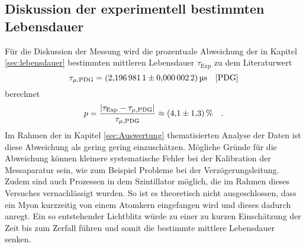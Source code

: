 \subsection{Diskussion der experimentell bestimmten Lebensdauer}
Für die Diskussion der Messung wird die prozentuale Abweichung der in Kapitel \ref{sec:lebensdauer} bestimmten mittleren Lebensdauer $\tau_\text{Exp}$ 
zu dem Literaturwert 
\begin{equation*}
    \tau_{\mu,\text{PDG}}=\SI{2.1969811 \pm0.0000022}{\micro\second} \quad\text{\cite{PDG}}    
\end{equation*}
berechnet
\begin{equation*}
    p=\frac{|\tau_\text{Exp}-\tau_{\mu,\text{PDG}}|}{\tau_{\mu,\text{PDG}}}\approx \SI{4.1\pm1.3}{\percent}\quad.
\end{equation*}
Im Rahmen der in Kapitel \ref{sec:Auswertung} thematisierten Analyse der Daten ist diese Abweichung als gering gering einzuschätzen. Mögliche Gründe für die Abweichung 
können kleinere systematische Fehler bei der Kalibration der Messaparatur sein, wie zum Beispiel Probleme bei der Verzögerungsleitung. Zudem sind auch Prozessen in dem
Szintillator möglich, die im Rahmen dieses Versuches vernachlässigt wurden. So ist es theoretisch nicht ausgeschlossen, dass ein Myon kurzzeitig von einem Atomkern 
eingefangen wird und dieses dadurch anregt. Ein so entstehender Lichtblitz würde zu einer zu kurzen Einschätzung der Zeit bis zum Zerfall führen und somit die 
bestimmte mittlere Lebensdauer senken.